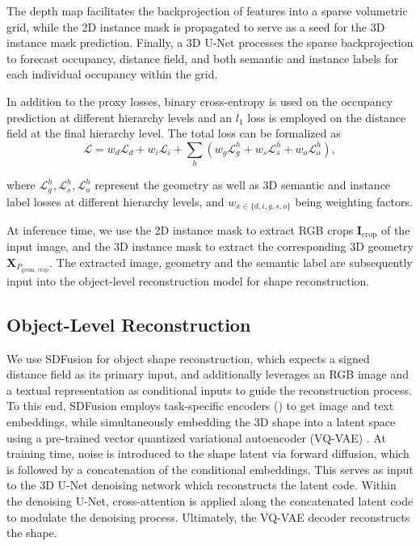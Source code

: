 The depth map facilitates the backprojection of features into a sparse volumetric grid, while the 2D instance mask is propagated to serve as a seed for the 3D instance mask prediction. Finally, a 3D U-Net \citep{cciccek20163d} processes the sparse backprojection to forecast occupancy, distance field, and both semantic and instance labels for each individual occupancy within the grid.

In addition to the proxy losses, binary cross-entropy is used on the occupancy prediction at different hierarchy levels and an $l_1$ loss is employed on the distance field at the final hierarchy level.
The total loss can be formalized as 
\begin{equation}
    \mathcal{L} = w_d \mathcal{L}_d + w_i \mathcal{L}_i + \sum_h (w_g \mathcal{L}_g^h + w_s \mathcal{L}_s^h + w_o \mathcal{L}_o^h),
\end{equation}

where $\mathcal{L}_g^h, \mathcal{L}_s^h, \mathcal{L}_o^h$ represent the geometry as well as 3D semantic and instance label losses at different hierarchy levels, and $w_{x\in\{d, i, g, s, o\}}$ being weighting factors.

At inference time, we use the 2D instance mask to extract RGB crops $\mathbf{I}_{\text{crop}}$ of the input image, and the 3D instance mask to extract the corresponding 3D geometry $\textbf{X}_{P_{\text{geom, crop}}}$.
The extracted image, geometry and the semantic label are subsequently input into the object-level reconstruction model for shape reconstruction.

\subsection{Object-Level Reconstruction}

We use SDFusion \citep{cheng2023sdfusion} for object shape reconstruction, which expects a signed distance field as its primary input, and additionally leverages an RGB image and a textual representation as conditional inputs to guide the reconstruction process. To this end, SDFusion employs task-specific encoders (\citep{radford2021learning, devlin2018bert}) to get image and text embeddings, while simultaneously embedding the 3D shape into a latent space using a pre-trained vector quantized variational autoencoder (VQ-VAE) \citep{oord2017neural}. At training time, noise is introduced to the shape latent via forward diffusion, which is followed by a concatenation of the conditional embeddings. This serves as input to the 3D U-Net \citep{cciccek20163d} denoising network which reconstructs the latent code. Within the denoising U-Net, cross-attention is applied along the concatenated latent code to modulate the denoising process. Ultimately, the VQ-VAE decoder reconstructs the shape.

